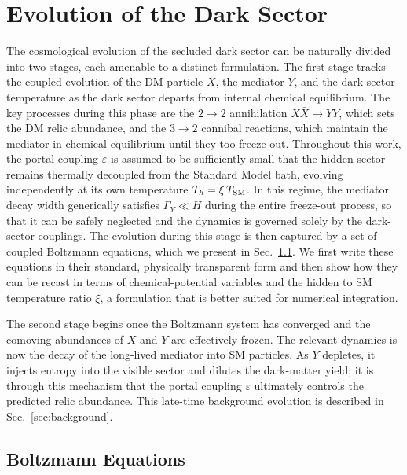 \section{Evolution of the Dark Sector}
\label{sec:evolution}

The cosmological evolution of the secluded dark sector can be naturally divided into two stages, each amenable to a distinct formulation.
The first stage tracks the coupled evolution of the DM particle $X$, the mediator $Y$, and the dark-sector temperature as the dark sector departs from internal chemical equilibrium. The key processes during this phase are the $2\to2$ annihilation $X\bar{X}\to YY$, which sets the DM relic abundance, and the $3\to2$ cannibal reactions, which maintain the mediator in chemical equilibrium until they too freeze out. Throughout this work, the portal coupling $\varepsilon$ is assumed to be sufficiently small that the hidden sector remains thermally decoupled from the Standard Model bath, evolving independently at its own temperature $T_h = \xi\,T_{\rm SM}$. In this regime, the mediator decay width generically satisfies $\Gamma_Y \ll H$ during the entire freeze-out process, so that it can be safely neglected and the dynamics is governed solely by the dark-sector couplings. The evolution during this stage is then captured by a set of coupled Boltzmann equations, which we present in Sec.~\ref{sec:boltzmann}. We first write these equations in their standard, physically transparent form and then show how they can be recast in terms of chemical-potential variables and the hidden to SM temperature ratio $\xi$, a formulation that is better suited for numerical integration.

The second stage begins once the Boltzmann system has converged and the comoving abundances of $X$ and $Y$ are effectively frozen. The relevant dynamics is now the decay of the long-lived mediator into SM particles. As $Y$ depletes, it injects entropy into the visible sector and dilutes the dark-matter yield; it is through this mechanism that the portal coupling $\varepsilon$ ultimately controls the predicted relic abundance. This late-time background evolution is described in Sec.~\ref{sec:background}.

\subsection{Boltzmann Equations}
\label{sec:boltzmann}

